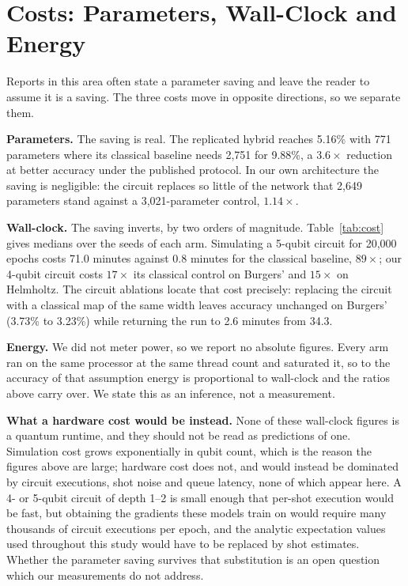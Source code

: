 \documentclass[conference,a4paper]{IEEEtran}
\begin{document}
\section{Costs: Parameters, Wall-Clock and Energy}
\label{sec:cost}

Reports in this area often state a parameter saving and leave the reader to assume it is a
saving. The three costs move in opposite directions, so we separate them.

\textbf{Parameters.} The saving is real. The replicated hybrid reaches 5.16\% with 771
parameters where its classical baseline needs 2{,}751 for 9.88\%, a $3.6\times$ reduction
at better accuracy under the published protocol. In our own architecture the saving is
negligible: the circuit replaces so little of the network that 2{,}649 parameters stand
against a 3{,}021-parameter control, $1.14\times$.

\textbf{Wall-clock.} The saving inverts, by two orders of magnitude.
Table~\ref{tab:cost} gives medians over the seeds of each arm. Simulating a 5-qubit
circuit for 20{,}000 epochs costs 71.0 minutes against 0.8 minutes for the classical
baseline, $89\times$; our 4-qubit circuit costs $17\times$ its classical control on
Burgers' and $15\times$ on Helmholtz. The circuit ablations locate that cost precisely:
replacing the circuit with a classical map of the same width leaves accuracy unchanged on
Burgers' (3.73\% to 3.23\%) while returning the run to 2.6 minutes from 34.3.

\textbf{Energy.} We did not meter power, so we report no absolute figures. Every arm ran
on the same processor at the same thread count and saturated it, so to the accuracy of
that assumption energy is proportional to wall-clock and the ratios above carry over. We
state this as an inference, not a measurement.

\textbf{What a hardware cost would be instead.} None of these wall-clock figures is a
quantum runtime, and they should not be read as predictions of one. Simulation cost grows
exponentially in qubit count, which is the reason the figures above are large; hardware
cost does not, and would instead be dominated by circuit executions, shot noise and queue
latency, none of which appear here. A 4- or 5-qubit circuit of depth 1--2 is small enough
that per-shot execution would be fast, but obtaining the gradients these models train on
would require many thousands of circuit executions per epoch, and the analytic
expectation values used throughout this study would have to be replaced by shot estimates.
Whether the parameter saving survives that substitution is an open question which our
measurements do not address.
\end{document}
